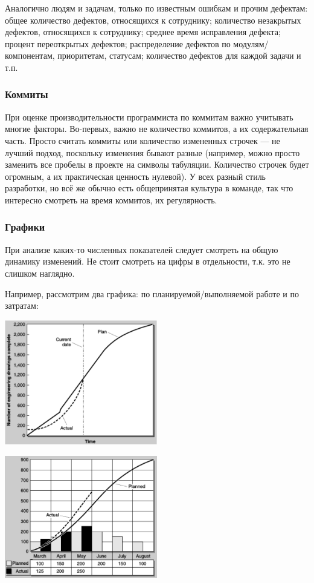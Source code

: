 \documentclass{../../text-style}
\begin{document}
Аналогично людям и задачам, только по известным ошибкам и прочим дефектам: общее количество дефектов, относящихся к сотруднику; количество незакрытых дефектов, относящихся к сотруднику; среднее время исправления дефекта; процент переоткрытых дефектов; распределение дефектов по модулям/компонентам, приоритетам, статусам; количество дефектов для каждой задачи  и т.п.

\subsubsection{Коммиты}

При оценке производительности программиста по коммитам важно учитывать многие факторы. Во-первых, важно не количество коммитов, а их содержательная часть. Просто считать коммиты или количество измененных строчек --- не лучший подход, поскольку изменения бывают разные (например, можно просто заменить все пробелы в проекте на символы табуляции. Количество строчек будет огромным, а их практическая ценность нулевой). У всех разный стиль разработки, но всё же обычно есть общепринятая культура в команде, так что интересно смотреть на время коммитов, их регулярность.

\subsubsection{Графики}

При анализе каких-то численных показателей следует смотреть на общую динамику изменений. Не стоит смотреть на цифры в отдельности, т.к. это не слишком наглядно.

Например, рассмотрим два графика: по планируемой/выполняемой работе и по затратам:

\begin{center}
    \includegraphics[width=0.5\textwidth]{plannedWorkGraph.png}
\end{center}

\begin{center}
    \includegraphics[width=0.5\textwidth]{costGraph.png}
\end{center}
\end{document}
